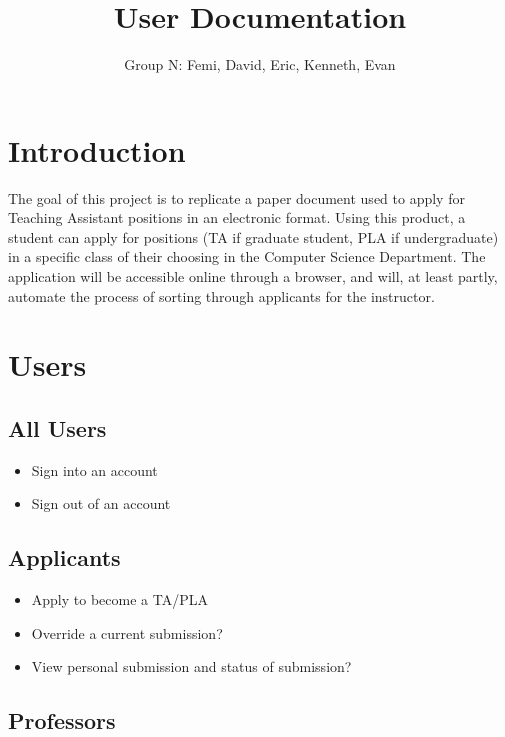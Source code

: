 \documentclass[11pt]{amsart}
\title{User Documentation}
\author{Group N: Femi, David, Eric, Kenneth, Evan}
\begin{document}
\maketitle
\section{Introduction}
\noindent The goal of this project is to replicate a paper document used to apply for Teaching Assistant positions in an electronic format. Using this product, a student can apply for positions (TA if graduate student, PLA if undergraduate) in a specific class of their choosing in the Computer Science Department. The application will be accessible online through a browser, and will, at least partly, automate the process of sorting through applicants for the instructor.
\section{Users}


\subsection{All Users}

\begin{itemize}
    \item{Sign into an account}
    \item{Sign out of an account}
\end{itemize}

\subsection{Applicants}

\begin{itemize}
    \item{Apply to become a TA/PLA}
    \item{Override a current submission?}
    \item{View personal submission and status of submission?}
\end{itemize}

\subsection{Professors}
\end{document}
